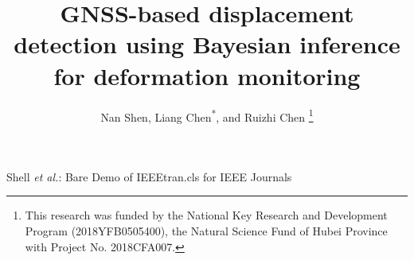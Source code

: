 \documentclass[journal]{IEEEtran}
\begin{document}
	\title{GNSS-based displacement detection using Bayesian inference for deformation monitoring}
	
	\author{Nan Shen, Liang Chen\textsuperscript{*}, and Ruizhi Chen%
		\thanks{This research was funded by the National Key Research and Development Program (2018YFB0505400), the Natural Science Fund of Hubei Province with Project No. 2018CFA007.}%
	}
	
	
	
	
	{Shell \MakeLowercase{\textit{et al.}}: Bare Demo of IEEEtran.cls for IEEE Journals}
	
\end{document}
